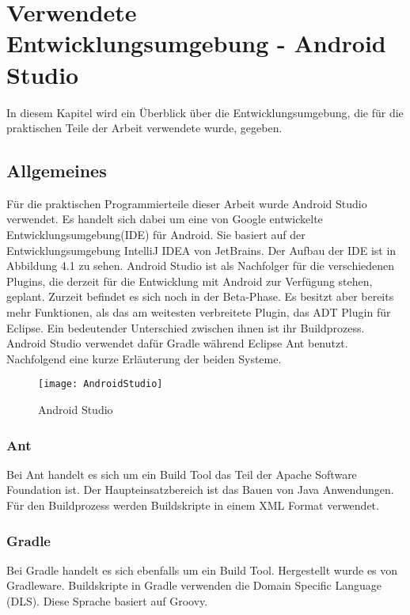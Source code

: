 \chapter [Verwendete Entwicklungsumgebung - Android Studio] {Verwendete Entwicklungsumgebung - Android Studio}
\label{chap:ide}

In diesem Kapitel wird ein Überblick über die Entwicklungsumgebung, die für die praktischen Teile der Arbeit verwendete wurde, gegeben. 

\section{Allgemeines}
Für die praktischen Programmierteile dieser Arbeit wurde Android Studio verwendet. Es handelt sich dabei um eine von Google entwickelte Entwicklungsumgebung(IDE) für Android. Sie basiert auf der Entwicklungsumgebung IntelliJ IDEA von JetBrains. Der Aufbau der IDE ist in Abbildung 4.1 zu sehen. Android Studio ist als Nachfolger für die verschiedenen Plugins, die derzeit für die Entwicklung mit Android zur Verfügung stehen, geplant. Zurzeit befindet es sich noch in der Beta-Phase. Es besitzt aber bereits mehr Funktionen, als das am weitesten verbreitete Plugin, das ADT Plugin für Eclipse. Ein bedeutender Unterschied zwischen ihnen ist ihr Buildprozess. Android Studio verwendet dafür Gradle während Eclipse Ant benutzt. Nachfolgend eine kurze Erläuterung der beiden Systeme.\cite{37}

\begin{figure}
\centering
\texttt{[image: AndroidStudio]}
\caption{Android Studio}
\label{fig:AndroidStudio}
\end{figure}

\subsection{Ant}
Bei Ant handelt es sich um ein Build Tool das Teil der Apache Software Foundation ist. Der Haupteinsatzbereich ist das Bauen von Java Anwendungen. Für den Buildprozess werden Buildskripte in einem XML Format verwendet.\cite{38}

\subsection{Gradle}
Bei Gradle handelt es sich ebenfalls um ein Build Tool. Hergestellt wurde es von Gradleware. Buildskripte in Gradle verwenden die Domain Specific Language (DLS). Diese Sprache basiert auf Groovy.\cite{39}


